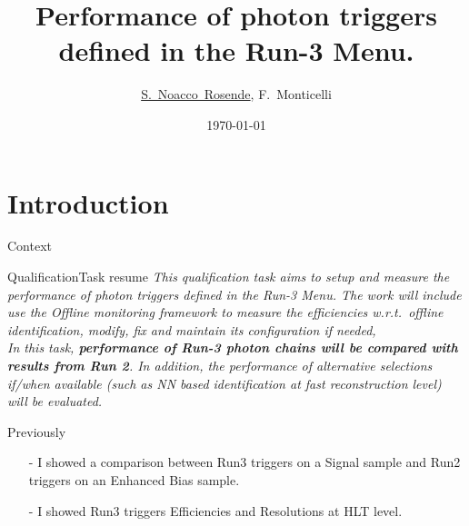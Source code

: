 \documentclass[aspectratio=1610,8pt]{beamer}					%
\title{%
    Performance of photon triggers defined in the Run-3 Menu.
}
\author{\underline{S.~Noacco~Rosende}, F.~Monticelli}
\institute[VFU]{%
    \inst{1}
    Instituto de F\'isica La Plata (CONICET-UNLP) \\
    \texttt{[image: images/iflp\_logo.png]}
    \and
    \inst{2}
    Universidad Nacional de La Plata \\
    \texttt{[image: images/unlp\_logo.png]}
}
\date{\today}									%
\begin{document}
\begin{frame}
  \titlepage
\end{frame}


\section{Introduction}
\begin{frame}{Context}
    \begin{block}{QualificationTask resume}
        \textit{%
            This qualification task aims to setup and measure the performance of photon triggers defined in the Run-3 Menu.
            The work will include use the Offline monitoring framework to measure the efficiencies w.r.t.\ offline identification,
            modify, fix and maintain its configuration if needed,
            \\
            In this task,
            \textbf{performance of Run-3 photon chains will be compared with results from Run 2}.
            In addition, the performance of alternative selections if/when available 
            (such as NN based identification at fast reconstruction level) will be evaluated.
            }
    \end{block}
    
    \begin{block}{Previously}
        \begin{itemize}
            \item [-]
                I showed a comparison between Run3 triggers on a Signal sample and Run2 triggers on an Enhanced Bias sample.
            \item [-]
                I showed Run3 triggers Efficiencies and Resolutions at HLT level.
        \end{itemize}
    \end{block}


\end{frame}
\end{document}

